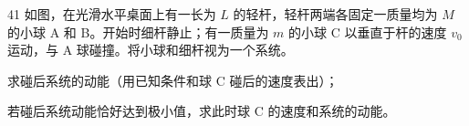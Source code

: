 \begin{problem}[第32届全国中学生物理竞赛复赛][刚体碰撞与动能]{41}
    如图，在光滑水平桌面上有一长为 $L$ 的轻杆，轻杆两端各固定一质量均为 $M$ 的小球 A 和 B。开始时细杆静止；有一质量为 $m$ 的小球 C 以垂直于杆的速度 $v_{0}$ 运动，与 A 球碰撞。将小球和细杆视为一个系统。
    \begin{subproblem}
        求碰后系统的动能（用已知条件和球 C 碰后的速度表出）；
    \end{subproblem}
    \begin{subproblem}
        若碰后系统动能恰好达到极小值，求此时球 C 的速度和系统的动能。
    \end{subproblem}
\end{problem}